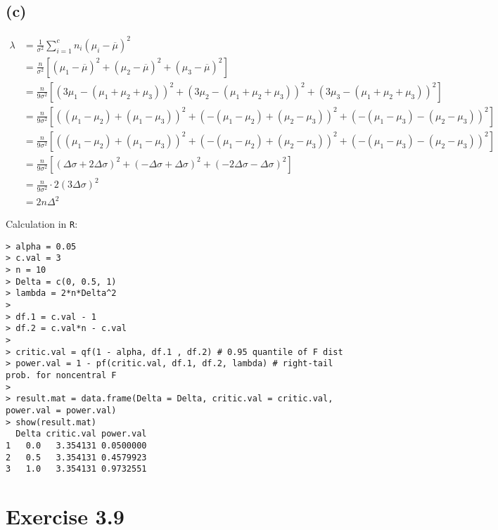 \documentclass[a4paper]{article}
\begin{document}
\subsection{(c)}
\begin{align*}
\lambda &= \frac{1}{\sigma^2} \sum_{i=1}^{c} n_{i}\left(\mu_{i} - \overline{\mu}\right)^2\\
&= \frac{n}{\sigma^2}\left[\left(\mu_{1} - \overline{\mu}\right)^2 + \left(\mu_{2} - \overline{\mu}\right)^2 + \left(\mu_{3} - \overline{\mu}\right)^2 \right]\\
&= \frac{n}{9\sigma^2}\left[\left(3\mu_{1} - (\mu_{1} + \mu_{2} + \mu_{3})\right)^2 + \left(3\mu_{2} - (\mu_{1} + \mu_{2} + \mu_{3})\right)^2 + \left(3\mu_{3} - (\mu_{1} + \mu_{2} + \mu_{3})\right)^2 \right]\\
&= \frac{n}{9\sigma^2}\left[\left( (\mu_{1} - \mu_{2}) + (\mu_{1} - \mu_{3}) \right)^2 + \left( -(\mu_{1} - \mu_{2}) + (\mu_{2} - \mu_{3}) \right)^2 + \left( -(\mu_{1} - \mu_{3}) - (\mu_{2} - \mu_{3}) \right)^2 \right]\\
&= \frac{n}{9\sigma^2}\left[\left( (\mu_{1} - \mu_{2}) + (\mu_{1} - \mu_{3}) \right)^2 + \left( -(\mu_{1} - \mu_{2}) + (\mu_{2} - \mu_{3}) \right)^2 + \left( -(\mu_{1} - \mu_{3}) - (\mu_{2} - \mu_{3}) \right)^2 \right]\\
&= \frac{n}{9\sigma^2}\left[\left(\Delta\sigma + 2\Delta\sigma \right)^2 + \left(-\Delta\sigma + \Delta\sigma \right)^2 + \left(-2\Delta\sigma -\Delta\sigma \right)^2 \right]\\
&= \frac{n}{9\sigma^2} \cdot 2(3\Delta\sigma)^2\\
&= 2n\Delta^2
\end{align*}

Calculation in \texttt{R}:
\begin{lstlisting}
> alpha = 0.05
> c.val = 3
> n = 10
> Delta = c(0, 0.5, 1)
> lambda = 2*n*Delta^2
> 
> df.1 = c.val - 1
> df.2 = c.val*n - c.val
> 
> critic.val = qf(1 - alpha, df.1 , df.2) # 0.95 quantile of F dist
> power.val = 1 - pf(critic.val, df.1, df.2, lambda) # right-tail prob. for noncentral F
> 
> result.mat = data.frame(Delta = Delta, critic.val = critic.val, power.val = power.val)
> show(result.mat)
  Delta critic.val power.val
1   0.0   3.354131 0.0500000
2   0.5   3.354131 0.4579923
3   1.0   3.354131 0.9732551
\end{lstlisting}


\vspace{\baselineskip}
\section{Exercise 3.9}
\end{document}

